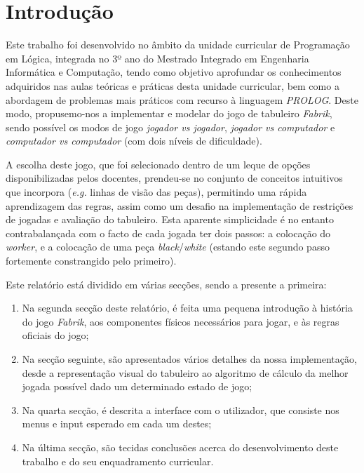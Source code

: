 \documentclass[a4paper]{article}
\begin{document}

\newpage

\section{Introdução}

Este trabalho foi desenvolvido no âmbito da unidade curricular de Programação em Lógica, integrada no 3º ano do Mestrado Integrado em Engenharia Informática e Computação, tendo como objetivo aprofundar os conhecimentos adquiridos nas aulas teóricas e práticas desta unidade curricular, bem como a abordagem de problemas mais práticos com recurso à linguagem \textit{PROLOG}. Deste modo, propusemo-nos a implementar e modelar do jogo de tabuleiro \textit{Fabrik}, sendo possível os modos de jogo \textit{jogador vs jogador}, \textit{jogador vs computador} e \textit{computador vs computador} (com dois níveis de dificuldade).

A escolha deste jogo, que foi selecionado dentro de um leque de opções disponibilizadas pelos docentes, prendeu-se no conjunto de conceitos intuitivos que incorpora (\textit{e.g.} linhas de visão das peças), permitindo uma rápida aprendizagem das regras, assim como um desafio na implementação de restrições de jogadas e avaliação do tabuleiro. Esta aparente simplicidade é no entanto contrabalançada com o facto de cada jogada ter dois passos: a colocação do \textit{worker}, e a colocação de uma peça \textit{black}/\textit{white} (estando este segundo passo fortemente constrangido pelo primeiro).

Este relatório está dividido em várias secções, sendo a presente a primeira:
\begin{enumerate}
\item Na segunda secção deste relatório, é feita uma pequena introdução à história do jogo \textit{Fabrik}, aos componentes físicos necessários para jogar, e às regras oficiais do jogo;
\item Na secção seguinte, são apresentados vários detalhes da nossa implementação, desde a representação visual do tabuleiro ao algoritmo de cálculo da melhor jogada possível dado um determinado estado de jogo;
\item Na quarta secção, é descrita a interface com o utilizador, que consiste nos menus e input esperado em cada um destes;
\item Na última secção, são tecidas conclusões acerca do desenvolvimento deste trabalho e do seu enquadramento curricular.
\end{enumerate}
\end{document}
